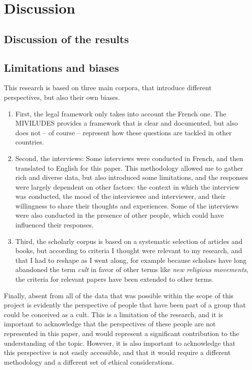 \chapter{Discussion}
\label{ch:discussion}

\section{Discussion of the results}
\label{sec:discussion_results}

\section{Limitations and biases}
\label{sec:limitations}

This research is based on three main corpora, that introduce different perspectives, but also their own biases.
\begin{enumerate}
	\item First, the legal framework only takes into account the French one. The MIVILUDES provides a framework that is clear and documented, but also does not – of course – represent how these questions are tackled in other countries.
	\item Second, the interviews: Some interviews were conducted in French, and then translated to English for this paper. This methodology allowed me to gather rich and diverse data, but also introduced some limitations, and the responses were largely dependent on other factors: the context in which the interview was conducted, the mood of the interviewee and interviewer, and their willingness to share their thoughts and experiences. Some of the interviews were also conducted in the presence of other people, which could have influenced their responses.
	\item Third, the scholarly corpus is based on a systematic selection of articles and books, but according to criteria I thought were relevant to my research, and that I had to reshape as I went along, for example because scholars have long abandoned the term \textit{cult} in favor of other terms like \textit{new religious movements}, the criteria for relevant papers have been extended to other terms.
\end{enumerate}

Finally, absent from all of the data that was possible within the scope of this project is evidently the perspective of people that have been part of a group that could be conceived as a cult. This is a limitation of the research, and it is important to acknowledge that the perspectives of these people are not represented in this paper, and would represent a significant contribution to the understanding of the topic. However, it is also important to acknowledge that this perspective is not easily accessible, and that it would require a different methodology and a different set of ethical considerations.

